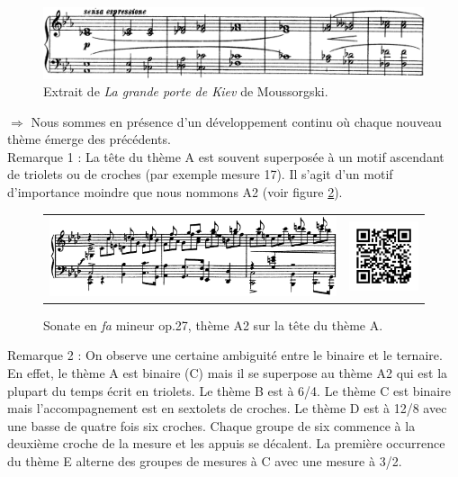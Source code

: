 \begin{figure}[!p]
  \begin{bigcenter}
    \includegraphics[width=15cm, keepaspectratio]{kiev.png}
  \end{bigcenter}
  \caption{\label{grande-porte-de-kiev}Extrait de \emph{La grande porte de Kiev} de Moussorgski.}
\end{figure}

$\Rightarrow$ Nous sommes en présence d'un développement continu où chaque nouveau thème émerge des précédents.\\

Remarque 1 : La tête du thème A est souvent superposée à un motif ascendant de triolets ou de croches (par exemple mesure 17). Il s'agit d'un motif d'importance moindre que nous nommons A2 (voir figure \ref{sonate-theme-12}).\\

\begin{figure}[!ht]
  \begin{bigcenter}
    \begin{tabular}{lr}
      \includegraphics[width=12.5cm, keepaspectratio]{sonate-theme-A2.png}
      &
      \includegraphics[width=3cm, keepaspectratio]{op1-qr.png}
    \end{tabular}
  \end{bigcenter}
  \caption{\label{sonate-theme-12}Sonate en \emph{fa} mineur op.27, thème A2 sur la tête du thème A.}
\end{figure}

Remarque 2 : On observe une certaine ambiguité entre le binaire et le ternaire. En effet, le thème A est binaire (C) mais il se superpose au thème A2 qui est la plupart du temps écrit en triolets. Le thème B est à 6/4. Le thème C est binaire mais l'accompagnement est en sextolets de croches. Le thème D est à 12/8 avec une basse de quatre fois six croches. Chaque groupe de six commence à la deuxième croche de la mesure et les appuis se décalent. La première occurrence du thème E alterne des groupes de mesures à C avec une mesure à 3/2.


